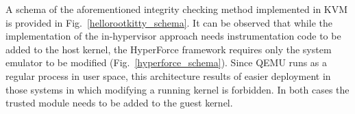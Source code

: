 %
%
A schema of the aforementioned integrity checking method implemented in KVM is provided in Fig.~\ref{hellorootkitty_schema}. It can be observed that while the implementation of the in-hypervisor approach needs instrumentation code to be added to the host kernel, the HyperForce framework requires only the system emulator to be modified (Fig.~\ref{hyperforce_schema}). Since QEMU runs as a regular process in user space, this architecture results of easier deployment in those systems in which modifying a running kernel is forbidden.  
In both cases the trusted module needs to be added to the guest kernel.\\


